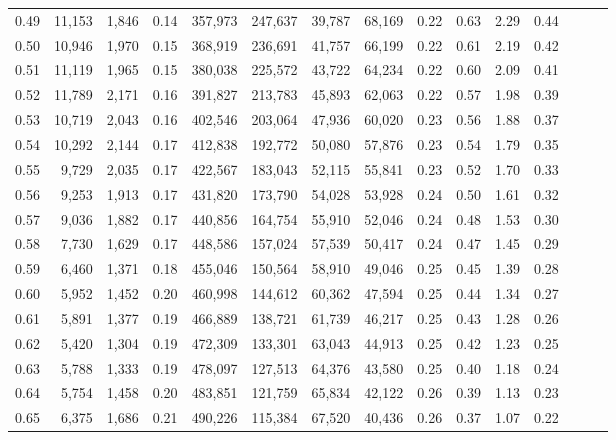 \begin{tabular}{rrrrrrrrrrrrrrr}
0.49 &  11,153 &  1,846 &  0.14 &  357,973 &  247,637 &   39,787 &   68,169 &  0.22 &  0.63 &  2.29 &      0.44 \\
0.50 &  10,946 &  1,970 &  0.15 &  368,919 &  236,691 &   41,757 &   66,199 &  0.22 &  0.61 &  2.19 &      0.42 \\
0.51 &  11,119 &  1,965 &  0.15 &  380,038 &  225,572 &   43,722 &   64,234 &  0.22 &  0.60 &  2.09 &      0.41 \\
0.52 &  11,789 &  2,171 &  0.16 &  391,827 &  213,783 &   45,893 &   62,063 &  0.22 &  0.57 &  1.98 &      0.39 \\
0.53 &  10,719 &  2,043 &  0.16 &  402,546 &  203,064 &   47,936 &   60,020 &  0.23 &  0.56 &  1.88 &      0.37 \\
0.54 &  10,292 &  2,144 &  0.17 &  412,838 &  192,772 &   50,080 &   57,876 &  0.23 &  0.54 &  1.79 &      0.35 \\
0.55 &   9,729 &  2,035 &  0.17 &  422,567 &  183,043 &   52,115 &   55,841 &  0.23 &  0.52 &  1.70 &      0.33 \\
0.56 &   9,253 &  1,913 &  0.17 &  431,820 &  173,790 &   54,028 &   53,928 &  0.24 &  0.50 &  1.61 &      0.32 \\
0.57 &   9,036 &  1,882 &  0.17 &  440,856 &  164,754 &   55,910 &   52,046 &  0.24 &  0.48 &  1.53 &      0.30 \\
0.58 &   7,730 &  1,629 &  0.17 &  448,586 &  157,024 &   57,539 &   50,417 &  0.24 &  0.47 &  1.45 &      0.29 \\
0.59 &   6,460 &  1,371 &  0.18 &  455,046 &  150,564 &   58,910 &   49,046 &  0.25 &  0.45 &  1.39 &      0.28 \\
0.60 &   5,952 &  1,452 &  0.20 &  460,998 &  144,612 &   60,362 &   47,594 &  0.25 &  0.44 &  1.34 &      0.27 \\
0.61 &   5,891 &  1,377 &  0.19 &  466,889 &  138,721 &   61,739 &   46,217 &  0.25 &  0.43 &  1.28 &      0.26 \\
0.62 &   5,420 &  1,304 &  0.19 &  472,309 &  133,301 &   63,043 &   44,913 &  0.25 &  0.42 &  1.23 &      0.25 \\
0.63 &   5,788 &  1,333 &  0.19 &  478,097 &  127,513 &   64,376 &   43,580 &  0.25 &  0.40 &  1.18 &      0.24 \\
0.64 &   5,754 &  1,458 &  0.20 &  483,851 &  121,759 &   65,834 &   42,122 &  0.26 &  0.39 &  1.13 &      0.23 \\
0.65 &   6,375 &  1,686 &  0.21 &  490,226 &  115,384 &   67,520 &   40,436 &  0.26 &  0.37 &  1.07 &      0.22 \\

\end{tabular}
